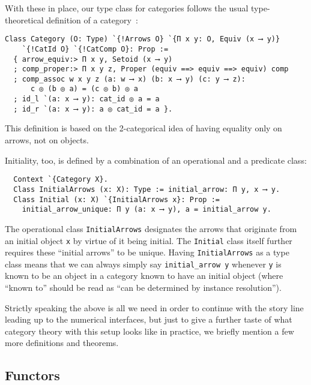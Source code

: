 \documentclass[a4paper,10pt,runningheads]{llncs}
\begin{document}
With these in place, our type class for categories follows the usual type-theoretical definition of a
category~\cite{saibi1995constructive}:
\begin{lstlisting}
Class Category (O: Type) `{!Arrows O} `{Π x y: O, Equiv (x ⟶ y)}
    `{!CatId O} `{!CatComp O}: Prop :=
  { arrow_equiv:> Π x y, Setoid (x ⟶ y)
  ; comp_proper:> Π x y z, Proper (equiv ==> equiv ==> equiv) comp
  ; comp_assoc w x y z (a: w ⟶ x) (b: x ⟶ y) (c: y ⟶ z):
      c ◎ (b ◎ a) = (c ◎ b) ◎ a
  ; id_l `(a: x ⟶ y): cat_id ◎ a = a
  ; id_r `(a: x ⟶ y): a ◎ cat_id = a }.
\end{lstlisting}
This definition is based on the 2-categorical idea of having equality only on arrows, not on objects.

Initiality, too, is defined by a combination of an operational and a predicate class:
\begin{lstlisting}
  Context `{Category X}.
  Class InitialArrows (x: X): Type := initial_arrow: Π y, x ⟶ y.
  Class Initial (x: X) `{InitialArrows x}: Prop :=
    initial_arrow_unique: Π y (a: x ⟶ y), a = initial_arrow y.
\end{lstlisting}
The operational class \lstinline|InitialArrows| designates the arrows that originate from an initial object \lstinline|x| by virtue of it being initial. The \lstinline|Initial| class itself further requires these ``initial arrows'' to be unique. Having \lstinline|InitialArrows| as a type class means that we can always simply say \lstinline|initial_arrow y| whenever \lstinline|y| is known to be an object in a category known to have an initial object (where ``known to'' should be read as ``can be determined by instance resolution'').

Strictly speaking the above is all we need in order to continue with the story line leading up to the numerical interfaces, but just to give a further taste of what category theory with this setup looks like in practice, we briefly mention a few more definitions and theorems.

\subsection{Functors}
\end{document}
